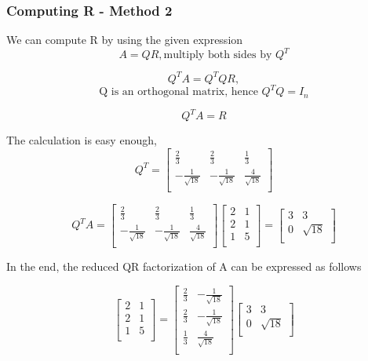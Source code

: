 \documentclass{article}
\begin{document}
\subsubsection{Computing R - Method 2}

We can compute R by using the given expression
$$
A=QR, \text{multiply both sides by }Q^{T}
$$

$$
Q^{T}A=Q^{T}QR, 
$$
$$
\text{Q is an orthogonal matrix, hence }Q^{T}Q=I_{n}
$$

$$
Q^{T}A=R
$$

The calculation is easy enough,
$$
Q^{T}=\left
[\begin{array}{ccc}
\frac{2}{3} & \frac{2}{3} & \frac{1}{3} \\
-\frac{1}{\sqrt{18}} & -\frac{1}{\sqrt{18}} & \frac{4}{\sqrt{18}} \\
\end{array}\right]
$$

$$
Q^{T}A = \left
[\begin{array}{ccc}
\frac{2}{3} & \frac{2}{3} & \frac{1}{3} \\
-\frac{1}{\sqrt{18}} & -\frac{1}{\sqrt{18}} & \frac{4}{\sqrt{18}} \\
\end{array}\right] \left
[\begin{array}{cc}
2 & 1 \\
2 & 1 \\
1 & 5 \\
\end{array}\right] = \left [\begin{array}{cc}
3& 3  \\
0 & \sqrt{18} \\
\end{array}\right]
$$


In the end, the reduced QR factorization of A can be expressed as follows

$$
\left
[\begin{array}{cc}
2 & 1 \\
2 & 1 \\
1 & 5 \\
\end{array}\right]=\left
[\begin{array}{cc}
\frac{2}{3} & -\frac{1}{\sqrt{18}} \\
\frac{2}{3} & -\frac{1}{\sqrt{18}} \\
\frac{1}{3} & \frac{4}{\sqrt{18}} \\
\end{array}\right] \left [\begin{array}{cc}
3& 3  \\
0 & \sqrt{18} \\
\end{array}\right]
$$
\end{document}
